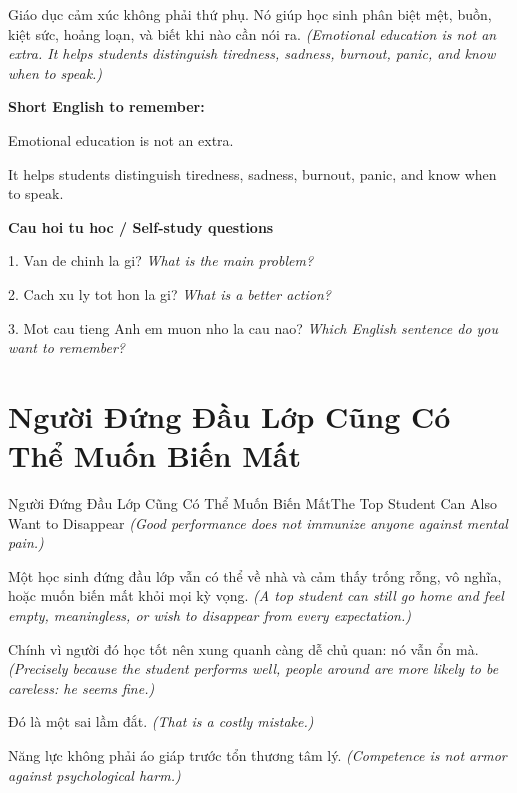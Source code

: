 \begin{baihoc}
Giáo dục cảm xúc không phải thứ phụ. Nó giúp học sinh phân biệt mệt, buồn, kiệt sức, hoảng loạn, và biết khi nào cần nói ra.
\textit{(Emotional education is not an extra. It helps students distinguish tiredness, sadness, burnout, panic, and know when to speak.)}
\end{baihoc}

\begin{ghinhoanh}
\textbf{Short English to remember:}

Emotional education is not an extra.

It helps students distinguish tiredness, sadness, burnout, panic, and know when to speak.

\end{ghinhoanh}

\begin{tuhocnhanh}
\textbf{Cau hoi tu hoc / Self-study questions}

1. Van de chinh la gi? \textit{What is the main problem?}

2. Cach xu ly tot hon la gi? \textit{What is a better action?}

3. Mot cau tieng Anh em muon nho la cau nao? \textit{Which English sentence do you want to remember?}
\end{tuhocnhanh}
\ngancach

\section{Người Đứng Đầu Lớp Cũng Có Thể Muốn Biến Mất}
\begin{truyen}{Người Đứng Đầu Lớp Cũng Có Thể Muốn Biến Mất}{The Top Student Can Also Want to Disappear}
\textit{(Good performance does not immunize anyone against mental pain.)}

Một học sinh đứng đầu lớp vẫn có thể về nhà và cảm thấy trống rỗng, vô nghĩa, hoặc muốn biến mất khỏi mọi kỳ vọng.
\textit{(A top student can still go home and feel empty, meaningless, or wish to disappear from every expectation.)}

Chính vì người đó học tốt nên xung quanh càng dễ chủ quan: nó vẫn ổn mà.
\textit{(Precisely because the student performs well, people around are more likely to be careless: he seems fine.)}

Đó là một sai lầm đắt.
\textit{(That is a costly mistake.)}

Năng lực không phải áo giáp trước tổn thương tâm lý.
\textit{(Competence is not armor against psychological harm.)}

\end{truyen}

